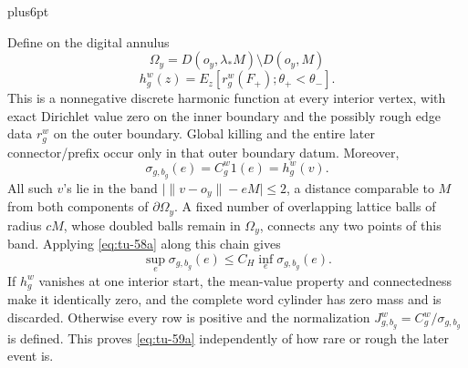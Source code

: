 \documentclass[12pt,reqno]{amsart}
\makeatletter
\theoremstyle{plain}
\theoremstyle{definition}
\theoremstyle{remark}
\renewenvironment{proof}[1][\proofname]{%
  \par
  \pushQED{\qed}%
  \normalfont
  \topsep6pt plus6pt\relax
  \trivlist
  \item[\hskip\labelsep\slshape #1\@addpunct{.}]%
  \ignorespaces
}{%
  \popQED
  \endtrivlist
  \@endpefalse
}
\DeclareRobustCommand{\qed}{%
  \leavevmode\unskip\penalty9999\hbox{}\nobreak
  \ifmmode
    \makebox[0pt][l]{\qquad\hbox{\qedsymbol}}%
  \else
    \qquad\hbox{\qedsymbol}%
  \fi
}
\renewcommand{\qedsymbol}{\rule[.47pt]{4pt}{6pt}}
\numberwithin{equation}{section}
\makeatother
\begin{document}
\begin{proof}[Proof of Lemma~\ref{lem:terminal-feynman-kac}]
Define on the digital annulus
\[
 \Omega_y=D(o_y,\lambda_*M)\setminus D(o_y,M)
\]
\begin{equation}
 h_g^w(z)=E_z[r_g^w(F_+);\theta_+<\theta_-].                \label{eq:tu-59a2}
\end{equation}
This is a nonnegative discrete harmonic function at every interior vertex,
with exact Dirichlet value zero on the inner boundary and the possibly rough
edge data \(r_g^w\) on the outer boundary.  Global killing and the entire
later connector/prefix occur only in that outer boundary datum.  Moreover,
\begin{equation}
                  \sigma_{g,b_g}(e)=C_g^w1(e)=h_g^w(v).     \label{eq:tu-59a3}
\end{equation}
All such \(v\)'s lie in the band
\(\bigl|\|v-o_y\|-eM\bigr|\le2\), a distance
comparable to \(M\) from both components of \(\partial\Omega_y\).
A fixed number of overlapping lattice balls of radius \(cM\), whose doubled
balls remain in \(\Omega_y\), connects any two points of this band.
Applying \eqref{eq:tu-58a} along this chain gives
\begin{equation}
       \sup_e\sigma_{g,b_g}(e)
              \le C_H\inf_e\sigma_{g,b_g}(e).              \label{eq:tu-59a}
\end{equation}
If \(h_g^w\) vanishes at one interior start, the mean-value property and
connectedness make it identically zero, and the complete word cylinder has
zero mass and is discarded.  Otherwise every row is positive and the
normalization \(J_{g,b_g}^w=C_g^w/\sigma_{g,b_g}\) is defined.  This proves
\eqref{eq:tu-59a} independently of how rare or rough the later event is.


\end{proof}
\end{document}
